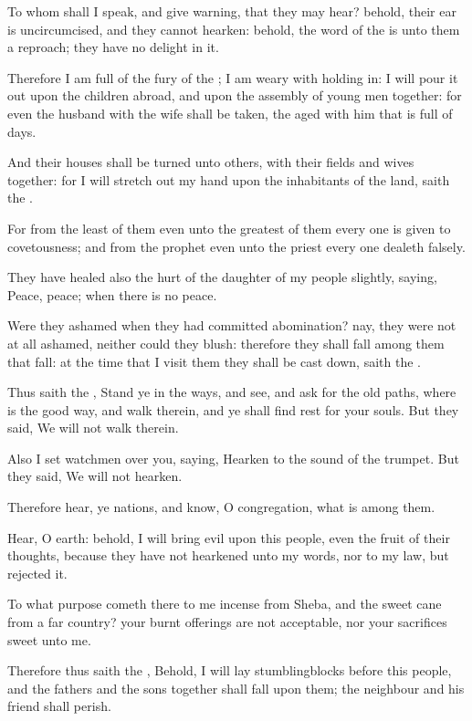 \verse To whom shall I speak, and give warning, that they may hear?  behold, their ear is uncircumcised, and they cannot hearken: behold, the word of the \LORD is unto them a reproach; they have no delight in it.

\verse Therefore I am full of the fury of the \LORD; I am weary with holding in: I will pour it out upon the children abroad, and upon the assembly of young men together: for even the husband with the wife shall be taken, the aged with him that is full of days.

\verse And their houses shall be turned unto others, with their fields and wives together: for I will stretch out my hand upon the inhabitants of the land, saith the \LORD.

\verse For from the least of them even unto the greatest of them every one is given to covetousness; and from the prophet even unto the priest every one dealeth falsely.

\verse They have healed also the hurt of the daughter of my people slightly, saying, Peace, peace; when there is no peace.

\verse Were they ashamed when they had committed abomination? nay, they were not at all ashamed, neither could they blush: therefore they shall fall among them that fall: at the time that I visit them they shall be cast down, saith the \LORD.

\verse Thus saith the \LORD, Stand ye in the ways, and see, and ask for the old paths, where is the good way, and walk therein, and ye shall find rest for your souls. But they said, We will not walk therein.

\verse Also I set watchmen over you, saying, Hearken to the sound of the trumpet. But they said, We will not hearken.

\verse Therefore hear, ye nations, and know, O congregation, what is among them.

\verse Hear, O earth: behold, I will bring evil upon this people, even the fruit of their thoughts, because they have not hearkened unto my words, nor to my law, but rejected it.

\verse To what purpose cometh there to me incense from Sheba, and the sweet cane from a far country? your burnt offerings are not acceptable, nor your sacrifices sweet unto me.

\verse Therefore thus saith the \LORD, Behold, I will lay stumblingblocks before this people, and the fathers and the sons together shall fall upon them; the neighbour and his friend shall perish.

